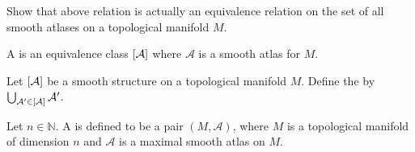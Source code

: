 \begin{exercise}
	Show that above relation is actually an equivalence relation on the set of all smooth atlases on a topological manifold $M$.
\end{exercise}

\begin{definition}
	A  is an equivalence class $\sbr[0]{\mathcal{A}}$ where $\mathcal{A}$ is a smooth atlas for $M$.
\end{definition}

\begin{definition}
	Let $\sbr[0]{\mathcal{A}}$ be a smooth structure on a topological manifold $M$. Define the  by $\bigcup_{\mathcal{A}' \in \sbr[0]{\mathcal{A}}} \mathcal{A}'$.
\end{definition}

\begin{definition}
	Let $n \in \mathbb{N}$. A  is defined to be a pair $(M,\mathcal{A})$, where $M$ is a topological manifold of dimension $n$ and $\mathcal{A}$ is a maximal smooth atlas on $M$.
\end{definition}

